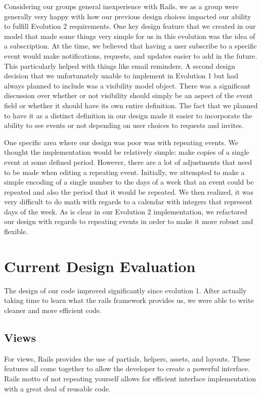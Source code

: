 \documentclass[11pt]{article}
\begin{document}
Considering our groups general inexperience with Rails, we as a group were generally very happy with how our previous design choices impacted our ability to fulfill Evolution 2 requirements.  One key design feature that we created in our model that made some things very simple for us in this evolution was the idea of a subscription.  At the time, we believed that having a user subscribe to a specific event would make notifications, requests, and updates easier to add in the future.  This particularly helped with things like email reminders.  A second design decision that we unfortunately unable to implement in Evolution 1 but had always planned to include was a visibility model object.  There was a significant discussion over whether or not visibility should simply be an aspect of the event field or whether it should have its own entire definition.  The fact that we planned to have it as a distinct definition in our design made it easier to incorporate the ability to see events or not depending on user choices to requests and invites.

One specific area where our design was poor was with repeating events.  We thought the implementation would be relatively simple: make copies of a single event at some defined period.  However, there are a lot of adjustments that need to be made when editing a repeating event.  Initially, we attempted to make a simple encoding of a single number to the days of a week that an event could be repeated and also the period that it would be repeated.  We then realized, it was very difficult to do math with regards to a calendar with integers that represent days of the week.  As is clear in our Evolution 2 implementation, we refactored our design with regards to repeating events in order to make it more robust and flexible.

\section{Current Design Evaluation}

The design of our code improved significantly since evolution 1. After actually taking time to learn what the rails framework provides us, we were able to write cleaner and more efficient code.

\subsection{Views}

For views, Rails provides the use of partials, helpers, assets, and layouts. These features all come together to allow the developer to create a powerful interface. Rails motto of not repeating yourself allows for efficient interface implementation with a great deal of reusable code.
\end{document}
